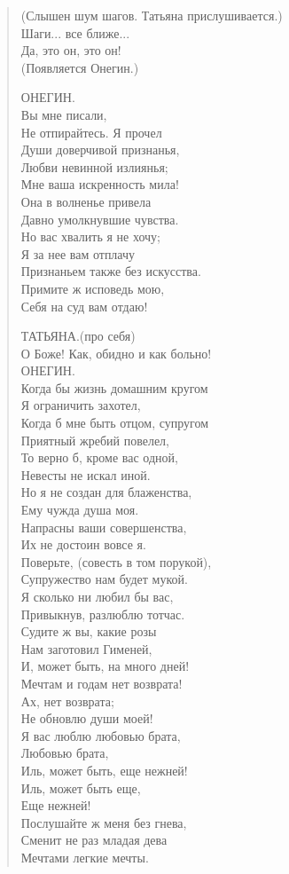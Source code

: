 \begin{verse}
(Слышен шум шагов. Татьяна прислушивается.)\\

Шаги... все ближе...\\
Да, это он, это он!\\

(Появляется Онегин.)

ОНЕГИН.\\
Вы мне писали,\\
Не отпирайтесь. Я прочел\\
Души доверчивой признанья,\\
Любви невинной излиянья;\\
Мне ваша искренность мила!\\
Она в волненье привела\\
Давно умолкнувшие чувства.\\
Но вас хвалить я не хочу;\\
Я за нее вам отплачу\\
Признаньем также без искусства.\\
Примите ж исповедь мою,\\
Себя на суд вам отдаю!

ТАТЬЯНА.(про себя)\\
О Боже! Как, обидно и как больно!\\

ОНЕГИН.\\
Когда бы жизнь домашним кругом\\
Я ограничить захотел,\\
Когда б мне быть отцом, супругом\\
Приятный жребий повелел,\\
То верно б, кроме вас одной,\\
Невесты не искал иной.\\
Но я не создан для блаженства,\\
Ему чужда душа моя.\\
Напрасны ваши совершенства,\\
Их не достоин вовсе я.\\
Поверьте, (совесть в том порукой),\\
Супружество нам будет мукой.\\
Я сколько ни любил бы вас,\\
Привыкнув, разлюблю тотчас.\\
Судите ж вы, какие розы\\
Нам заготовил Гименей,\\
И, может быть, на много дней!\\
Мечтам и годам нет возврата!\\
Ах, нет возврата;\\
Не обновлю души моей!\\
Я вас люблю любовью брата,\\
Любовью брата,\\
Иль, может быть, еще нежней!\\
Иль, может быть еще,\\
Еще нежней!\\
Послушайте ж меня без гнева,\\
Сменит не раз младая дева\\
Мечтами легкие мечты.\\


\end{verse}
